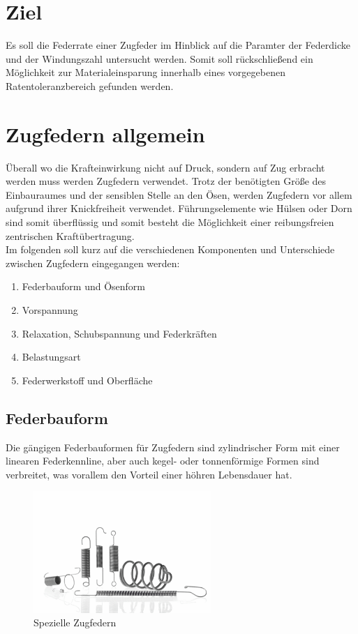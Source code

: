 \newpage
\section*{Ziel}
Es soll die Federrate einer Zugfeder im Hinblick auf die Paramter der Federdicke und der Windungszahl
untersucht werden. Somit soll rückschließend ein Möglichkeit zur Materialeinsparung 
innerhalb eines vorgegebenen Ratentoleranzbereich gefunden werden.  

\section{Zugfedern allgemein}
Überall wo die Krafteinwirkung nicht auf Druck, sondern auf Zug erbracht werden muss
werden Zugfedern verwendet. Trotz der benötigten Größe des Einbauraumes und der sensiblen
Stelle an den Ösen, werden Zugfedern vor allem aufgrund ihrer Knickfreiheit verwendet.
Führungselemente wie Hülsen oder Dorn sind somit überflüssig und somit besteht die Möglichkeit
einer reibungsfreien zentrischen Kraftübertragung.\\
Im folgenden soll kurz auf die verschiedenen Komponenten und Unterschiede zwischen
Zugfedern eingegangen werden:
\begin{enumerate}
    \item Federbauform und Ösenform
    \item Vorspannung
    \item Relaxation, Schubspannung und Federkräften
    \item Belastungsart
    \item Federwerkstoff und Oberfläche
\end{enumerate}



\subsection{Federbauform}
Die gängigen Federbauformen für Zugfedern sind zylindrischer Form mit einer linearen
Federkennline, aber auch kegel- oder tonnenförmige Formen sind verbreitet, was vorallem
den Vorteil einer höhren Lebensdauer hat.
\begin{figure}[H]
    \centering
    \includegraphics[width=0.6\textwidth]{bilder/Input/zugfedern_spezial.jpg}
    \caption{Spezielle Zugfedern \cite{KompZ}}
\end{figure}



